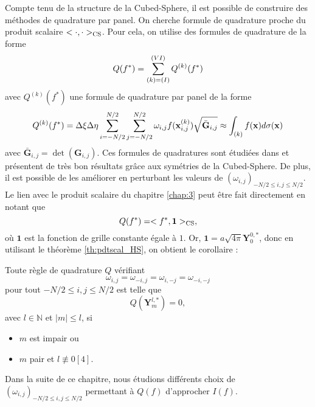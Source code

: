 Compte tenu de la structure de la Cubed-Sphere, il est possible de construire des méthodes de quadrature par panel. On cherche formule de quadrature proche du produit scalaire $< \cdot, \cdot >_{\text{CS}}$. Pour cela, on utilise des formules de quadrature de la forme
\begin{equation}
Q(f^*) = \displaystyle\sum\limits_{(k) = (I)}^{(VI)} Q^{(k)}(f^*)
\end{equation}
avec $Q^{(k)}(f^*)$ une formule de quadrature par panel de la forme
\begin{equation}
Q^{(k)}(f^*) = \Delta \xi \Delta \eta \displaystyle\sum\limits_{i=-N/2}^{N/2} \displaystyle\sum\limits_{j=-N/2}^{N/2} \omega_{i,j} f(\mathbf{x}_{i,j}^{(k)}) \sqrt{\bar{\mathbf{G}}_{i,j}} \approx \displaystyle\int_{(k)} f(\mathbf{x}) d \sigma(\mathbf{x})
\end{equation}
avec $\bar{\mathbf{G}}_{i,j} = \det(\mathbf{G}_{i,j})$.
Ces formules de quadratures sont étudiées dans \cite{Portelenelle2018} et présentent de très bon résultats grâce aux symétries de la Cubed-Sphere. De plus, il est possible de les améliorer en perturbant les valeurs de $(\omega_{i,j})_{-N/2 \leq i,j \leq N/2}$. Le lien avec le produit scalaire du chapitre \ref{chap:3} peut être fait directement en notant que
\begin{equation}
Q(f^*) = <f^*, \mathbf{1}>_{\text{CS}},
\end{equation}
où $\mathbf{1}$ est la fonction de grille constante égale à $1$.
Or, $\mathbf{1} = a \sqrt{4 \pi} \mathbf{Y}_0^{0,*}$, donc en utilisant le théorème \ref{th:pdtscal_HS}, on obtient le corollaire :
\begin{corollaire}
Toute règle de quadrature $Q$ vérifiant
\begin{equation}
\omega_{i,j} = \omega_{-i,j} = \omega_{i,-j} = \omega_{-i,-j}
\end{equation}
pour tout $-N/2 \leq i,j \leq N/2$ est telle que
\begin{equation}
Q \left( \mathbf{Y}_m^{l,*} \right) = 0,
\end{equation}
avec $l \in \mathbb{N}$ et $|m| \leq l$, si
\begin{itemize}
\item $m$ est impair ou
\item $m$ pair et $l \not\equiv 0 [4]$.
\end{itemize}
\label{cor:quadrature_exacte}
\end{corollaire}

Dans la suite de ce chapitre, nous étudions différents choix de $(\omega_{i,j})_{-N/2 \leq i,j \leq N/2}$ permettant à $Q(f)$ d'approcher $I(f)$.






















